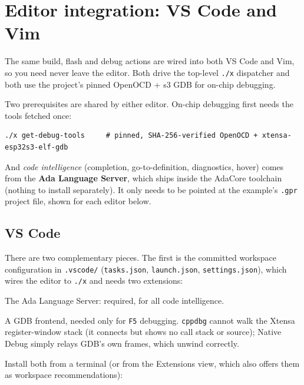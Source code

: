 \section{Editor integration: VS Code and Vim}

The same build, flash and debug actions are wired into both VS Code and Vim, so
you need never leave the editor. Both drive the top-level \texttt{./x} dispatcher
and both use the project's pinned OpenOCD + s3 GDB for on-chip debugging.

Two prerequisites are shared by either editor. On-chip debugging first needs the
tools fetched once:

\begin{lstlisting}[style=sh]
./x get-debug-tools     # pinned, SHA-256-verified OpenOCD + xtensa-esp32s3-elf-gdb
\end{lstlisting}

And \emph{code intelligence} (completion, go-to-definition, diagnostics, hover)
comes from the \textbf{Ada Language Server}, which ships inside the AdaCore
toolchain (nothing to install separately). It only needs to be pointed at the
example's \texttt{.gpr} project file, shown for each editor below.

\subsection{VS Code}

There are two complementary pieces. The first is the committed workspace
configuration in \texttt{.vscode/} (\texttt{tasks.json}, \texttt{launch.json},
\texttt{settings.json}), which wires the editor to \texttt{./x} and needs two
extensions:

\begin{description}[style=nextline]
\item[Ada \& SPARK (\texttt{AdaCore.ada}).] The Ada Language Server: required,
  for all code intelligence.
\item[Native Debug (\texttt{webfreak.debug}).] A GDB frontend, needed only for
  \texttt{F5} debugging. \texttt{cppdbg} cannot walk the Xtensa register-window
  stack (it connects but shows no call stack or source); Native Debug simply
  relays GDB's own frames, which unwind correctly.
\end{description}

Install both from a terminal (or from the Extensions view, which also offers them
as workspace recommendations):

